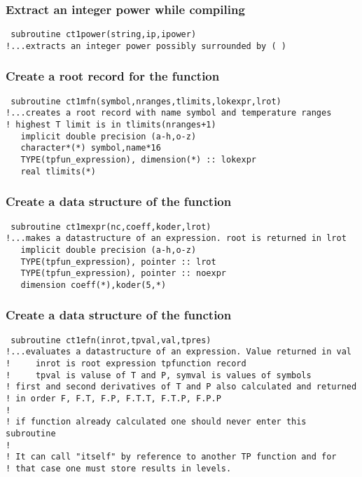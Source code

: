 \documentclass[12pt]{article}
\begin{document}
\subsubsection{Extract an integer power while compiling}

\begin{verbatim}
 subroutine ct1power(string,ip,ipower)
!...extracts an integer power possibly surrounded by ( )
\end{verbatim}

\subsubsection{Create a root record for the function}

\begin{verbatim}
 subroutine ct1mfn(symbol,nranges,tlimits,lokexpr,lrot)
!...creates a root record with name symbol and temperature ranges
! highest T limit is in tlimits(nranges+1)
   implicit double precision (a-h,o-z)
   character*(*) symbol,name*16
   TYPE(tpfun_expression), dimension(*) :: lokexpr
   real tlimits(*)
\end{verbatim}

\subsubsection{Create a data structure of the function}

\begin{verbatim}
 subroutine ct1mexpr(nc,coeff,koder,lrot)
!...makes a datastructure of an expression. root is returned in lrot
   implicit double precision (a-h,o-z)
   TYPE(tpfun_expression), pointer :: lrot
   TYPE(tpfun_expression), pointer :: noexpr
   dimension coeff(*),koder(5,*)
\end{verbatim}

\subsubsection{Create a data structure of the function}

\begin{verbatim}
 subroutine ct1efn(inrot,tpval,val,tpres)
!...evaluates a datastructure of an expression. Value returned in val
!     inrot is root expression tpfunction record
!     tpval is valuse of T and P, symval is values of symbols
! first and second derivatives of T and P also calculated and returned
! in order F, F.T, F.P, F.T.T, F.T.P, F.P.P
!
! if function already calculated one should never enter this subroutine
!
! It can call "itself" by reference to another TP function and for
! that case one must store results in levels.
\end{verbatim}
\end{document}

